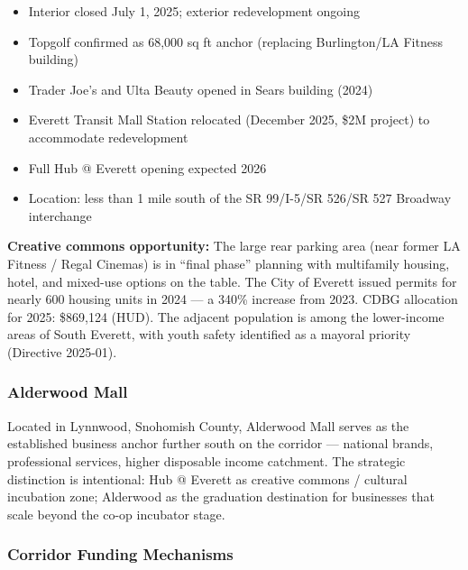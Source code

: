 \documentclass[11pt,letterpaper]{article}
\begin{document}
\begin{itemize}[leftmargin=*]
  \item Interior closed July 1, 2025; exterior redevelopment ongoing
  \item Topgolf confirmed as 68,000 sq ft anchor (replacing Burlington/LA Fitness building)
  \item Trader Joe's and Ulta Beauty opened in Sears building (2024)
  \item Everett Transit Mall Station relocated (December 2025, \$2M project) to accommodate redevelopment
  \item Full Hub @ Everett opening expected 2026
  \item Location: less than 1 mile south of the SR 99/I-5/SR 526/SR 527 Broadway interchange
\end{itemize}

\textbf{Creative commons opportunity:} The large rear parking area (near former LA Fitness / Regal Cinemas) is in ``final phase'' planning with multifamily housing, hotel, and mixed-use options on the table. The City of Everett issued permits for nearly 600 housing units in 2024 --- a 340\% increase from 2023. CDBG allocation for 2025: \$869,124 (HUD). The adjacent population is among the lower-income areas of South Everett, with youth safety identified as a mayoral priority (Directive 2025-01).

\subsubsection{Alderwood Mall}

Located in Lynnwood, Snohomish County, Alderwood Mall serves as the established business anchor further south on the corridor --- national brands, professional services, higher disposable income catchment. The strategic distinction is intentional: Hub @ Everett as creative commons / cultural incubation zone; Alderwood as the graduation destination for businesses that scale beyond the co-op incubator stage.

\subsubsection{Corridor Funding Mechanisms}
\end{document}
